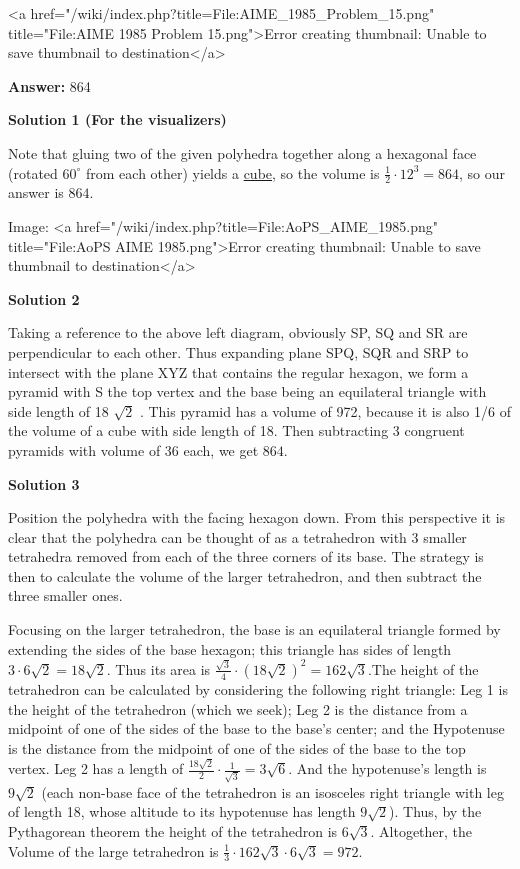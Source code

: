 \begin{enumerate}
 <a href="/wiki/index.php?title=File:AIME\_1985\_Problem\_15.png" title="File:AIME 1985 Problem 15.png">Error creating thumbnail: Unable to save thumbnail to destination</a>

 \textbf{Answer: }864



\textbf{Solution 1 (For the visualizers)}

Note that gluing two of the given polyhedra together along a hexagonal face (rotated $60^\circ$ from each other) yields a \href{https://artofproblemsolving.com/wiki/index.php?title=Cube\_(geometry)}{ cube}, so the volume is $\frac12 \cdot 12^3 = 864$, so our answer is $\boxed{864}$.

 Image: <a href="/wiki/index.php?title=File:AoPS\_AIME\_1985.png" title="File:AoPS AIME 1985.png">Error creating thumbnail: Unable to save thumbnail to destination</a>




\textbf{Solution 2}

Taking a reference to the above left diagram, obviously SP, SQ and SR are perpendicular to each other. Thus expanding plane SPQ, SQR and SRP to intersect with the plane XYZ that contains the regular hexagon, we form a pyramid with S the top vertex and the base being an equilateral triangle with side length of 18 $\sqrt{2}$ . This pyramid has a volume of 972, because it is also 1/6 of the volume of a cube with side length of 18. Then subtracting 3 congruent pyramids with volume of 36 each, we get $864$.

 



\textbf{Solution 3}

Position the polyhedra with the facing hexagon down. From this perspective it is clear that the polyhedra can be thought of as a tetrahedron with 3 smaller tetrahedra removed from each of the three corners of its base. The strategy is then to calculate the volume of the larger tetrahedron, and then subtract the three smaller ones.

 Focusing on the larger tetrahedron, the base is an equilateral triangle formed by extending the sides of the base hexagon; this triangle has sides of length $3\cdot6\sqrt{2}=18\sqrt{2}$. Thus its area is $\frac{\sqrt{3}}{4} \cdot (18 \sqrt{2})^2 = 162\sqrt{3}$.The height of the tetrahedron can be calculated by considering the following right triangle: Leg 1 is the height of the tetrahedron (which we seek); Leg 2 is the distance from a midpoint of one of the sides of the base to the base's center; and the Hypotenuse is the distance from the midpoint of one of the sides of the base to the top vertex. Leg 2 has a length of $\frac{18\sqrt{2}}{2}\cdot\frac{1}{\sqrt{3}} = 3\sqrt{6}$. And the hypotenuse's length is $9\sqrt{2}$ (each non-base face of the tetrahedron is an isosceles right triangle with leg of length 18, whose altitude to its hypotenuse has length $9\sqrt{2}$). Thus, by the Pythagorean theorem the height of the tetrahedron is $6\sqrt{3}$. Altogether, the Volume of the large tetrahedron is $\frac{1}{3}\cdot162\sqrt{3}\cdot6\sqrt{3} = 972$.


\end{enumerate}
